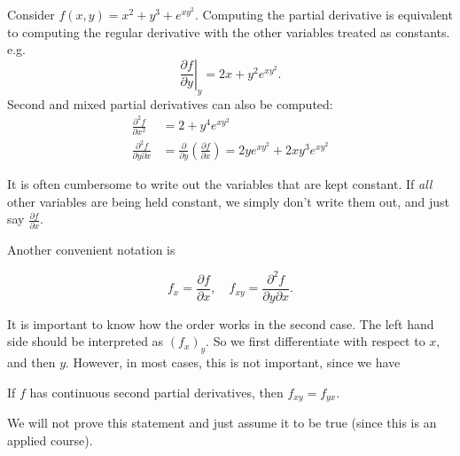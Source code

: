 \documentclass[a4paper]{article}
\begin{document}
\begin{eg}
  Consider $f(x, y) = x^2 + y^3 + e^{xy^2}$. Computing the partial derivative is equivalent to computing the regular derivative with the other variables treated as constants. e.g.
  \[
    \left.\frac{\partial f}{\partial y}\right|_y = 2x + y^2e^{xy^2}.
  \]
  Second and mixed partial derivatives can also be computed:
  \begin{align*}
    \frac{\partial^2f}{\partial x^2} &= 2 + y^4e^{xy^2}\\
    \frac{\partial^2 f}{\partial y\partial x} &= \frac{\partial}{\partial y}\left(\frac{\partial f}{\partial x}\right) = 2ye^{xy^2} + 2xy^{3}e^{xy^2}
  \end{align*}
\end{eg}
It is often cumbersome to write out the variables that are kept constant. If \emph{all} other variables are being held constant, we simply don't write them out, and just say $\frac{\partial f}{\partial x}$.

Another convenient notation is
\begin{notation}
  \[
    f_x = \frac{\partial f}{\partial x},\quad f_{xy} = \frac{\partial^2 f}{\partial y\partial x}.
  \]
\end{notation}
It is important to know how the order works in the second case. The left hand side should be interpreted as $(f_x)_y$. So we first differentiate with respect to $x$, and then $y$. However, in most cases, this is not important, since we have
\begin{thm}
  If $f$ has continuous second partial derivatives, then $f_{xy} = f_{yx}$.
\end{thm}
We will not prove this statement and just assume it to be true (since this is an applied course).
\end{document}
